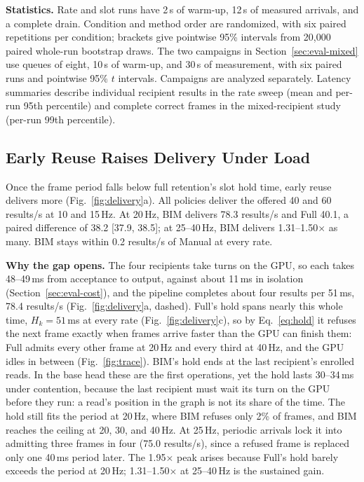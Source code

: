 \documentclass[conference]{IEEEtran}
\newcommand{\ms}{\,ms}
\newcommand{\Hz}{\,Hz}
\begin{document}
\textbf{Statistics.} Rate and slot runs have 2\,s of warm-up, 12\,s of measured arrivals, and a complete drain. Condition and method order are randomized, with six paired repetitions per condition; brackets give pointwise 95\% intervals from 20,000 paired whole-run bootstrap draws. The two campaigns in Section~\ref{sec:eval-mixed} use queues of eight, 10\,s of warm-up, and 30\,s of measurement, with six paired runs and pointwise 95\% $t$ intervals. Campaigns are analyzed separately. Latency summaries describe individual recipient results in the rate sweep (mean and per-run 95th percentile) and complete correct frames in the mixed-recipient study (per-run 99th percentile).

\subsection{Early Reuse Raises Delivery Under Load}
\label{sec:eval-delivery}

Once the frame period falls below full retention's slot hold time, early reuse delivers more (Fig.~\ref{fig:delivery}a). All policies deliver the offered 40 and 60 results/s at 10 and 15\Hz. At 20\Hz, BIM delivers 78.3 results/s and Full 40.1, a paired difference of 38.2 [37.9, 38.5]; at 25--40\Hz, BIM delivers 1.31--1.50$\times$ as many. BIM stays within 0.2 results/s of Manual at every rate.

\textbf{Why the gap opens.} The four recipients take turns on the GPU, so each takes 48--49\ms{} from acceptance to output, against about 11\ms{} in isolation (Section~\ref{sec:eval-cost}), and the pipeline completes about four results per 51\ms, 78.4 results/s (Fig.~\ref{fig:delivery}a, dashed). Full's hold spans nearly this whole time, $H_k=51$\ms{} at every rate (Fig.~\ref{fig:delivery}c), so by Eq.~\eqref{eq:hold} it refuses the next frame exactly when frames arrive faster than the GPU can finish them: Full admits every other frame at 20\Hz{} and every third at 40\Hz, and the GPU idles in between (Fig.~\ref{fig:trace}). BIM's hold ends at the last recipient's enrolled reads. In the base head these are the first operations, yet the hold lasts 30--34\ms{} under contention, because the last recipient must wait its turn on the GPU before they run: a read's position in the graph is not its share of the time. The hold still fits the period at 20\Hz, where BIM refuses only 2\% of frames, and BIM reaches the ceiling at 20, 30, and 40\Hz. At 25\Hz, periodic arrivals lock it into admitting three frames in four (75.0 results/s), since a refused frame is replaced only one 40\ms{} period later. The 1.95$\times$ peak arises because Full's hold barely exceeds the period at 20\Hz; 1.31--1.50$\times$ at 25--40\Hz{} is the sustained gain.
\end{document}

